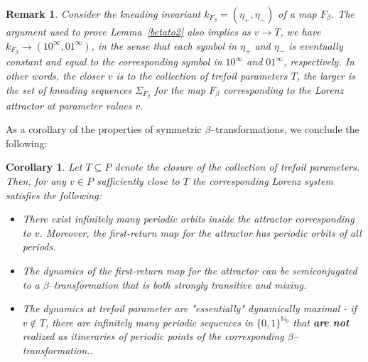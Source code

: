 \documentclass[10pt,reqno]{amsart}
\theoremstyle{plain}
\theoremstyle{assumption}
\theoremstyle{notation}
\theoremstyle{claim}
\theoremstyle{conj}
\newtheorem{remark}{\textbf{Remark}}[section]
\theoremstyle{theorem}
\theoremstyle{proposition}
\theoremstyle{corollary}
\newtheorem{corollary}{Corollary}[section]
\begin{document}
\begin{remark}
\label{convergence} Consider the kneading invariant $k_{F_\beta}=(\eta_+,\eta_-)$ of a map $F_\beta$. The argument used to prove Lemma~\ref{betato2} also implies as $v\to T$, we have $k_{F_\beta}\to(10^\infty,01^\infty)$, in the sense that each symbol in $\eta_+$ and $\eta_-$ is eventually constant and equal to the corresponding symbol in $10^\infty$ and $01^\infty$, respectively. In other words, the closer $v$ is to the collection of trefoil parameters $T$, the larger is the set of kneading sequences $\Sigma_{F_\beta}$ for the map $F_\beta$ corresponding to the Lorenz attractor at parameter values $v$.\end{remark}

As a corollary of the properties of symmetric $\beta$--transformations, we conclude the following:
\begin{corollary}
    \label{mixingattractor} Let $T\subseteq P$ denote the closure of the collection of trefoil parameters. Then, for any $v\in P$ sufficiently close to $T$ the corresponding Lorenz system satisfies the following:
    \begin{itemize}
        \item There exist infinitely many periodic orbits inside the attractor corresponding to $v$. Moreover, the first-return map for the attractor has periodic orbits of all periods.
        \item The dynamics of the first-return map for the attractor can be semiconjugated to a $\beta$--transformation that is both strongly transitive and mixing.
        \item  The dynamics at trefoil parameter are "essentially" dynamically maximal - if $v\not\in T$, there are infinitely many periodic sequences in $\{0,1\}^{\mathbb{N}_0}$ that \textbf{are not} realized as itineraries of periodic points of the corresponding $\beta$--transformation..

 
    \end{itemize}
\end{corollary}
\end{document}
